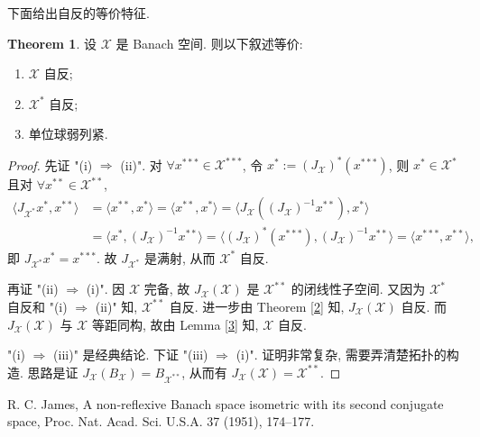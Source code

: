 \documentclass[a4paper,11pt]{article}
\theoremstyle{definition}
\newtheorem{theorem}{Theorem}[section]
\begin{document}
下面给出自反的等价特征.

\begin{theorem}
    设 $ \mathcal{X} $ 是 Banach 空间. 则以下叙述等价:
    \begin{enumerate}[{\rm(i)}]
        \item $ \mathcal{X} $ 自反;
        \item $ \mathcal{X}^* $ 自反;
        \item 单位球弱列紧.
    \end{enumerate}
\end{theorem}

\begin{proof}
    先证 "(i) $\Longrightarrow$ (ii)". 对 $ \forall x^{***} \in \mathcal{X}^{***} $,
    令 $ x^* := (J_\mathcal{X})^* (x^{***}) $, 
    则 $ x^* \in \mathcal{X}^* $ 且对 $ \forall x^{**} \in \mathcal{X}^{**} $,
    \begin{align*}
        \langle J_{\mathcal{X}^*} x^*, x^{**} \rangle
            &= \langle x^{**}, x^* \rangle
            = \langle x^{**}, x^* \rangle
            = \langle J_\mathcal{X} ((J_\mathcal{X})^{-1} x^{**}), x^* \rangle \\
            &= \langle x^*, (J_\mathcal{X})^{-1} x^{**} \rangle
            = \langle (J_\mathcal{X})^* (x^{***}), (J_\mathcal{X})^{-1} x^{**} \rangle
            = \langle x^{***}, x^{**} \rangle,
    \end{align*}
    即 $ J_{\mathcal{X}^*} x^* = x^{***} $. 故 $ J_{\mathcal{X}^*} $ 是满射, 从而 $ \mathcal{X}^* $ 自反.
    
    再证 "(ii) $\Longrightarrow$ (i)". 
    因 $ \mathcal{X} $ 完备, 故 $ J_\mathcal{X}(\mathcal{X}) $ 是 $ \mathcal{X}^{**} $ 的闭线性子空间.
    又因为 $ \mathcal{X}^* $ 自反和 "(i) $\Longrightarrow$ (ii)" 知, $ \mathcal{X}^{**} $ 自反.
    进一步由 Theorem \ref{2} 知, $ J_\mathcal{X}(\mathcal{X}) $ 自反. 
    而 $ J_\mathcal{X}(\mathcal{X}) $ 与 $ \mathcal{X} $ 等距同构, 故由 Lemma \ref{3} 知, $ \mathcal{X} $ 自反.
    
     "(i) $\Longrightarrow$ (iii)" 是经典结论.
     下证 "(iii) $\Longrightarrow$ (i)". 
     证明非常复杂, 需要弄清楚拓扑的构造.
     思路是证 $ J_\mathcal{X}(B_\mathcal{X}) = B_{\mathcal{X}^{**}} $, 
     从而有 $ J_\mathcal{X}(\mathcal{X}) = \mathcal{X}^{**} $.
\end{proof}

\begin{thebibliography}{99}
     R. C. James, A non-reflexive Banach space isometric with its second conjugate space,
     Proc. Nat. Acad. Sci. U.S.A. 37 (1951), 174--177.
\end{thebibliography}
\end{document}
